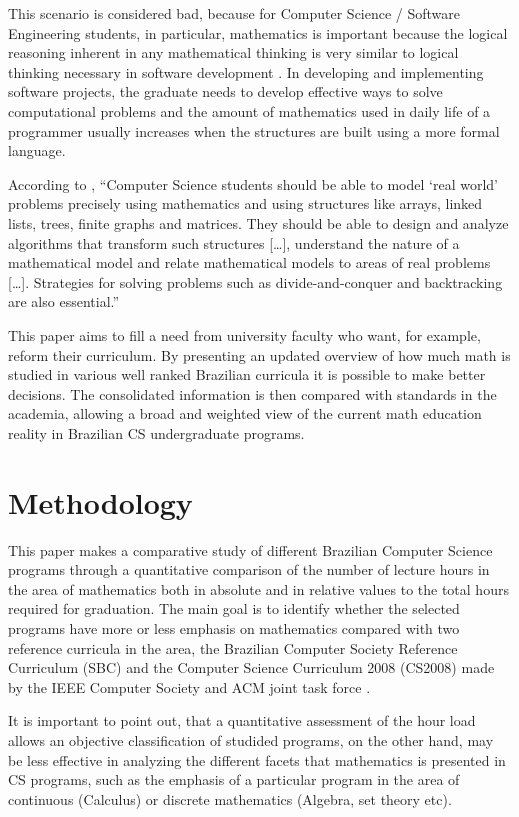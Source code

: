 \documentclass[conference]{IEEEtran}
\begin{document}
	This scenario is considered bad, because for Computer Science / Software Engineering students, in particular, mathematics is important because the logical reasoning inherent in any mathematical thinking is very similar to logical thinking necessary in software development \cite{ralston:do_need_mathematics}. In developing and implementing software projects, the graduate needs to develop effective ways to solve computational problems and the amount of mathematics used in daily life of a programmer usually increases when the structures are built using a more formal language. \cite{ralston:do_need_mathematics}

	According to \cite{kelemen:has_become_math_phobic}, ``Computer Science students should be able to model `real world' problems precisely using mathematics and using structures like arrays, linked lists, trees, finite graphs and matrices. They should be able to design and analyze algorithms that transform such structures [\ldots], understand the nature of a mathematical model and relate mathematical models to areas of real problems [\ldots]. Strategies for solving problems such as divide-and-conquer and backtracking are also essential.''

	This paper aims to fill a need from university faculty who want, for example, reform their curriculum. By presenting an updated overview of how much math is studied in various well ranked Brazilian curricula it is possible to make better decisions. The consolidated information is then compared with standards in the academia, allowing a broad and weighted view of the current math education reality in Brazilian CS undergraduate programs.
	
\section{Methodology}
	This paper makes a comparative study of different Brazilian Computer Science programs through a quantitative comparison of the number of lecture hours in the area of mathematics both in absolute and in relative values to the total hours required for graduation. The main goal is to identify whether the selected programs have more or less emphasis on mathematics compared with two reference curricula in the area, the Brazilian Computer Society Reference Curriculum (SBC) \cite{sbc} and the Computer Science Curriculum 2008 (CS2008) made by the IEEE Computer Society and ACM joint task force \cite{cs2008}.

	It is important to point out, that a quantitative assessment of the hour load allows an objective classification of studided programs, on the other hand, may be less effective in analyzing the different facets that mathematics is presented in CS programs, such as the emphasis of a particular program in the area of continuous (Calculus) or discrete mathematics (Algebra, set theory etc).
\end{document}

